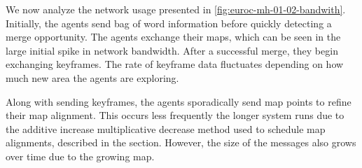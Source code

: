 We now analyze the network usage presented in \autoref{fig:euroc-mh-01-02-bandwith}. Initially, the agents send bag of word information before quickly detecting a merge opportunity. The agents exchange their maps, which can be seen in the large initial spike in network bandwidth. After a successful merge, they begin exchanging keyframes. The rate of keyframe data fluctuates depending on how much new area the agents are exploring.


Along with sending keyframes, the agents sporadically send map points to refine their map alignment. This occurs less frequently the longer system runs due to the additive increase multiplicative decrease method used to schedule map alignments, described in the  section. However, the size of the messages also grows over time due to the growing map.


